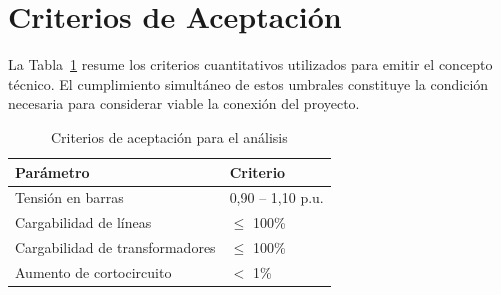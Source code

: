 \section{Criterios de Aceptación}

La Tabla~\ref{tab:criterios} resume los criterios cuantitativos utilizados para emitir el concepto técnico. El cumplimiento simultáneo de estos umbrales constituye la condición necesaria para considerar viable la conexión del proyecto.

\begin{table}[H]
    \centering
    \caption{Criterios de aceptación para el análisis}
    \label{tab:criterios}
    \begin{tabular}{ll}
    \toprule
    \textbf{Parámetro} & \textbf{Criterio} \\
    \midrule
    Tensión en barras & 0,90 -- 1,10 p.u. \\
    Cargabilidad de líneas & $\leq$ 100\% \\
    Cargabilidad de transformadores & $\leq$ 100\% \\
    Aumento de cortocircuito & $<$ 1\% \\
    \bottomrule
    \end{tabular}
\end{table}
